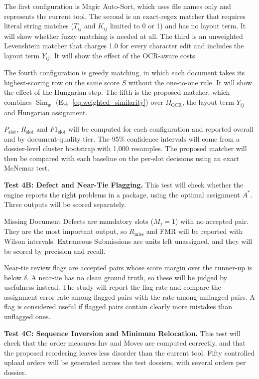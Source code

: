 The first configuration is Magic Auto-Sort, which uses file names only and represents the current tool. The second is an exact-regex matcher that requires literal string matches ($T_{ij}$ and $K_{ij}$ limited to 0 or 1) and has no layout term. It will show whether fuzzy matching is needed at all. The third is an unweighted Levenshtein matcher that charges 1.0 for every character edit and includes the layout term $Y_{ij}$. It will show the effect of the OCR-aware costs.

The fourth configuration is greedy matching, in which each document takes its highest-scoring row on the same score $S$ without the one-to-one rule. It will show the effect of the Hungarian step. The fifth is the proposed matcher, which combines $\operatorname{Sim}_w$ (Eq.~\eqref{eq:weighted_similarity}) over $\Omega_{\mathrm{OCR}}$, the layout term $Y_{ij}$ and Hungarian assignment.

$P_{\mathrm{slot}}$, $R_{\mathrm{slot}}$ and $F1_{\mathrm{slot}}$ will be computed for each configuration and reported overall and by document-quality tier. The 95\% confidence intervals will come from a dossier-level cluster bootstrap with 1,000 resamples. The proposed matcher will then be compared with each baseline on the per-slot decisions using an exact McNemar test.

\textbf{Test 4B: Defect and Near-Tie Flagging.} This test will check whether the engine reports the right problems in a package, using the optimal assignment $A^*$. Three outputs will be scored separately.

Missing Document Defects are mandatory slots ($M_j=1$) with no accepted pair. They are the most important output, so $R_{\mathrm{miss}}$ and FMR will be reported with Wilson intervals. Extraneous Submissions are units left unassigned, and they will be scored by precision and recall.

Near-tie review flags are accepted pairs whose score margin over the runner-up is below $\delta$. A near-tie has no clean ground truth, so these will be judged by usefulness instead. The study will report the flag rate and compare the assignment error rate among flagged pairs with the rate among unflagged pairs. A flag is considered useful if flagged pairs contain clearly more mistakes than unflagged ones.

\textbf{Test 4C: Sequence Inversion and Minimum Relocation.} This test will check that the order measures Inv and Moves are computed correctly, and that the proposed reordering leaves less disorder than the current tool. Fifty controlled upload orders will be generated across the test dossiers, with several orders per dossier.

